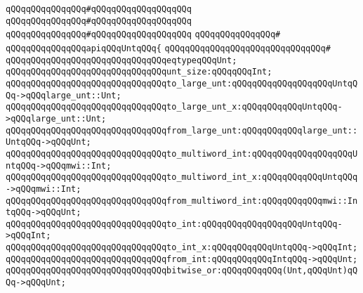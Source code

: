 \verb|qQQqqQQqqQQqqQQq#qQQqqQQqqQQqqQQqqQQq|\newline
\verb|qQQqqQQqqQQqqQQq#qQQqqQQqqQQqqQQqqQQq|\newline
\verb|qQQqqQQqqQQqqQQq#qQQqqQQqqQQqqQQqqQQq|\newline
\verb|qQQqqQQqqQQqqQQq#|\newline
\verb|qQQqqQQqqQQqqQQqapiqQQqUntqQQq{|\newline
\verb|qQQqqQQqqQQqqQQqqQQqqQQqqQQqqQQq#|\newline
\verb|qQQqqQQqqQQqqQQqqQQqqQQqqQQqqQQqeqtypeqQQqUnt;|\newline
\newline
\verb|qQQqqQQqqQQqqQQqqQQqqQQqqQQqqQQqunt_size:qQQqqQQqInt;|\newline
\newline
\verb|qQQqqQQqqQQqqQQqqQQqqQQqqQQqqQQqto_large_unt:qQQqqQQqqQQqqQQqqQQqUntqQQq->qQQqlarge_unt::Unt;|\newline
\verb|qQQqqQQqqQQqqQQqqQQqqQQqqQQqqQQqto_large_unt_x:qQQqqQQqqQQqUntqQQq->qQQqlarge_unt::Unt;|\newline
\verb|qQQqqQQqqQQqqQQqqQQqqQQqqQQqqQQqfrom_large_unt:qQQqqQQqqQQqlarge_unt::UntqQQq->qQQqUnt;|\newline
\newline
\verb|qQQqqQQqqQQqqQQqqQQqqQQqqQQqqQQqto_multiword_int:qQQqqQQqqQQqqQQqqQQqUntqQQq->qQQqmwi::Int;|\newline
\verb|qQQqqQQqqQQqqQQqqQQqqQQqqQQqqQQqto_multiword_int_x:qQQqqQQqqQQqUntqQQq->qQQqmwi::Int;|\newline
\verb|qQQqqQQqqQQqqQQqqQQqqQQqqQQqqQQqfrom_multiword_int:qQQqqQQqqQQqmwi::IntqQQq->qQQqUnt;|\newline
\newline
\verb|qQQqqQQqqQQqqQQqqQQqqQQqqQQqqQQqto_int:qQQqqQQqqQQqqQQqqQQqUntqQQq->qQQqInt;|\newline
\verb|qQQqqQQqqQQqqQQqqQQqqQQqqQQqqQQqto_int_x:qQQqqQQqqQQqUntqQQq->qQQqInt;|\newline
\verb|qQQqqQQqqQQqqQQqqQQqqQQqqQQqqQQqfrom_int:qQQqqQQqqQQqIntqQQq->qQQqUnt;|\newline
\newline
\verb|qQQqqQQqqQQqqQQqqQQqqQQqqQQqqQQqbitwise_or:qQQqqQQqqQQq(Unt,qQQqUnt)qQQq->qQQqUnt;|\newline
